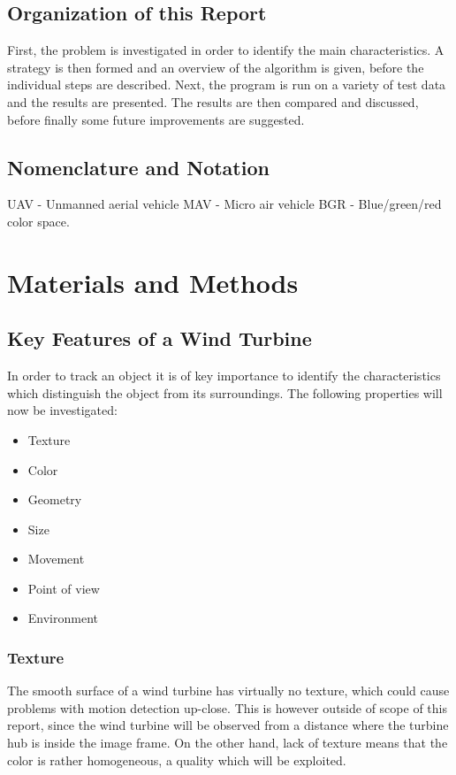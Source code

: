 \documentclass[a4paper,10pt]{article}
\begin{document}
  
  \subsection{Organization of this Report}
  First, the problem is investigated in order to identify the main characteristics. A strategy is then formed and an overview of the algorithm is given, before the individual steps are described. Next, the program is run on a variety of test data and the results are presented. The results are then compared and discussed, before finally some future improvements are suggested.
  
  \subsection{Nomenclature and Notation}
  UAV - Unmanned aerial vehicle
  MAV - Micro air vehicle
  BGR - Blue/green/red color space. 
  
\section{Materials and Methods}

  \subsection{Key Features of a Wind Turbine}
  In order to track an object it is of key importance to identify the characteristics which distinguish the object from its surroundings. The following properties will now be investigated:
    \begin{itemize}
     \item Texture
     \item Color
     \item Geometry
     \item Size
     \item Movement
     \item Point of view
     \item Environment
    \end{itemize}

      \subsubsection{Texture}
	The smooth surface of a wind turbine has virtually no texture, which could cause problems with motion detection up-close. This is however outside of scope of this report, since the wind turbine will be observed from a distance where the turbine hub is inside the image frame. On the other hand, lack of texture means that the color is rather homogeneous, a quality which will be exploited.
	
\end{document}
